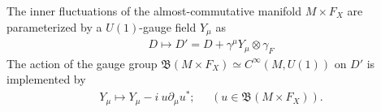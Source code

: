 \begin{myproposition}
    The inner fluctuations of the almost-commutative manifold $M\times
    F_X$ are parameterized by a $U(1)$-gauge field $Y_\mu$ as
    \begin{align}
        D \mapsto D' = D + \gamma ^\mu Y_\mu \otimes \gamma_F
    \end{align}
    The action of the gauge group $\mathfrak{B}(M\times F_X) \simeq
    C^\infty (M, U(1))$ on $D'$ is implemented by
    \begin{align}
        Y_\mu \mapsto Y_\mu - i\ u\partial_\mu u^*; \;\;\;\;\; (u\in
        \mathfrak{B}(M\times F_X)).
    \end{align}
\end{myproposition}

